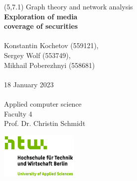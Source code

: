 \begin{titlepage}

\begingroup
\begin{textblock}{6}(5,7.1)
\setlength{\parindent}{0pt}
\fontsize{10pt}{1.1em}\selectfont
Graph theory and network analysis
\vspace{0.1cm}
\\
\LARGE
{\color{htwgreen}
\textbf{Exploration of media \\ coverage of securities}
}\\\\
\fontsize{10pt}{1.1em}\selectfont
Konstantin Kochetov (559121),\\
Sergey Wolf (553749),\\
Mikhail Poberezhnyi (558681)
\\
\\
18 January 2023\\\\
Applied computer science\\
Faculty 4\\
Prof. Dr. Christin Schmidt\\
\end{textblock}
\endgroup
     
\vfill
        
\begin{center}
\includegraphics[width=0.28\textwidth,keepaspectratio]{images/HTW_Logo_rgb.jpg}
\end{center}

\end{titlepage}